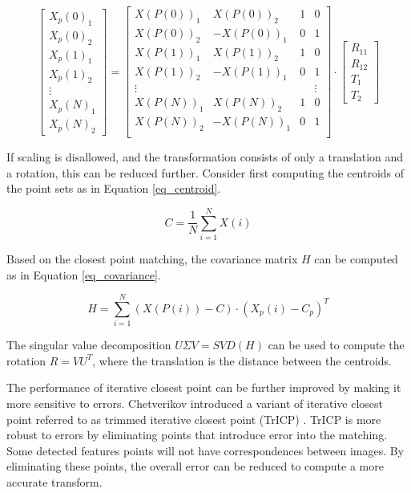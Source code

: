 \documentclass[sigconf]{acmart/acmart}
\begin{document}
\begin{equation}
\begin{bmatrix}
X_p(0)_1 \\
X_p(0)_2 \\
X_p(1)_1 \\
X_p(1)_2 \\
\vdots \\
X_p(N)_1 \\
X_p(N)_2
\end{bmatrix}
=
\begin{bmatrix}
X(P(0))_1 & X(P(0))_2 & 1 & 0 \\
X(P(0))_2 & -X(P(0))_1 & 0 & 1 \\
X(P(1))_1 & X(P(1))_2 & 1 & 0 \\
X(P(1))_2 & -X(P(1))_1 & 0 & 1 \\
\vdots & & & \vdots \\
X(P(N))_1 & X(P(N))_2 & 1 & 0 \\
X(P(N))_2 & -X(P(N))_1 & 0 & 1 \\
\end{bmatrix}
\cdot
\begin{bmatrix}
R_{11} \\
R_{12} \\
T_1 \\
T_2
\end{bmatrix}
\label{eq_reduced_icp_matrix}
\end{equation}

If scaling is disallowed, and the transformation consists of only a translation and a rotation, this can be reduced further. Consider first computing the centroids of the point sets as in Equation \ref{eq_centroid}.

\begin{equation}
C = \frac{1}{N}\sum\limits_{i=1}^{N}X(i)
\label{eq_centroid}
\end{equation}

Based on the closest point matching, the covariance matrix $H$ can be computed as in Equation \ref{eq_covariance}.

\begin{equation}
H=\sum\limits_{i=1}^{N} (X(P(i)) - C) \cdot (X_p(i) - C_p)^T
\label{eq_covariance}
\end{equation}

The singular value decomposition $U\Sigma V = SVD(H)$ can be used to compute the rotation $R=VU^T$, where the translation is the distance between the centroids.

The performance of iterative closest point can be further improved by making it more sensitive to errors. Chetverikov introduced a variant of iterative closest point referred to as trimmed iterative closest point (TrICP) \cite{chetverikov_trimmed_2002}. TrICP is more robust to errors by eliminating points that introduce error into the matching. Some detected features points will not have correspondences between images. By eliminating these points, the overall error can be reduced to compute a more accurate transform.
\end{document}
